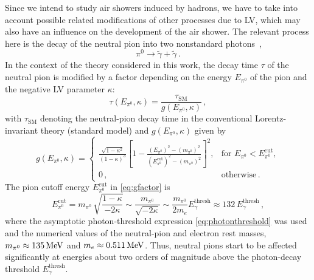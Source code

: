 \documentclass[aps,prd,preprint,longbibliography]{revtex4-1}
\begin{document}
Since we intend to study air showers induced by hadrons, we have to
take into account possible related modifications of other processes due to LV,
which may also have an influence on the development of the air
shower. The relevant process here is the decay of the neutral pion
into two nonstandard photons~\cite{DiazKlinkhamerRisse2016,Klinkhamer2016},
\begin{equation}
\label{eq:pi0-decay}
\pi^{0}\to\widetilde{\gamma}+\widetilde{\gamma}\,.
\end{equation}
In the context of the theory considered in this work,
the decay time $\tau$ of the neutral pion is modified by a factor depending on the energy $E_{\pi^{0}}$ of the pion and
the negative LV parameter $\kappa$:
\begin{equation}
\tau(E_{\pi^{0}},\kappa) = \frac{\tau_\text{SM}}{g(E_{\pi^{0}},\kappa)}\,,
\label{eq:piondecaytime}
\end{equation}
with $\tau_\text{SM}$ denoting the neutral-pion decay time in the conventional Lorentz-invariant theory (standard model)
and $g(E_{\pi^{0}},\kappa)$ given by~\cite{Klinkhamer2016}
\begin{equation}
g(E_{\pi^{0}},\kappa) =  \begin{cases}
\frac{\textstyle{\sqrt{1-\kappa^2}}}{\textstyle{(1-\kappa)^3}}
    \left[1-
    \frac
    {\textstyle{\left(E_{\pi^{0}}\right)^2-\left(m_{\pi^{0}}\right)^2}}
    {\textstyle{\left(E^\text{cut}_{\pi^{0}}\right)^2-\left(m_{\pi^{0}}\right)^2}}
    \right]^2,
    & \text{for } \textstyle{E_{\pi^{0}}<E^\text{cut}_{\pi^{0}}},\\
    0\,, & \text{otherwise}\,.
  \end{cases}
\label{eq:gfactor}
\end{equation}
The pion cutoff energy $E^\text{cut}_{\pi^{0}}$ in \eqref{eq:gfactor} is
\begin{equation}
E^\text{cut}_{\pi^{0}} =
m_{\pi^{0}}\, \sqrt{\frac{1-\kappa}{-2\kappa}}
\sim \frac{m_{\pi^{0}}}{\sqrt{-2\kappa}}
\sim \frac{m_{\pi^{0}}}{2m_e} E^\text{thresh}_\gamma
\approx 132\, E^\text{thresh}_\gamma\,,
\label{eq:pionthreshold}
\end{equation}
where the asymptotic
photon-threshold expression \eqref{eq:photonthreshold}
was used
and the numerical values of the neutral-pion and electron rest masses,
$m_{\pi^{0}} \approx \unit[135]{MeV}$
and $m_e \approx \unit[0.511]{MeV}$.
Thus, neutral pions start to be affected significantly at energies
about two orders of magnitude above the photon-decay threshold $E^\text{thresh}_\gamma$.
\end{document}

